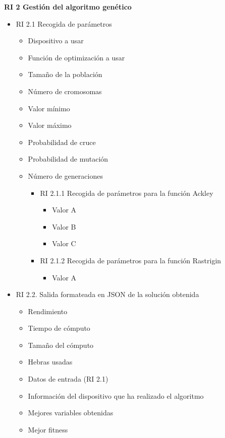 \textbf{RI 2 Gestión del algoritmo genético}

\begin{itemize}
	\item RI 2.1 Recogida de parámetros 
	
	\begin{itemize}
		\item Dispositivo a usar
		\item Función de optimización a usar
		\item Tamaño de la población
		\item Número de cromosomas
		\item Valor mínimo
		\item Valor máximo
		\item Probabilidad de cruce
		\item Probabilidad de mutación
		\item Número de generaciones
		\begin{itemize}
			\item RI 2.1.1 Recogida de parámetros para la función Ackley
			\begin{itemize}
				\item Valor A
				\item Valor B
				\item Valor C
			\end{itemize}
			
			\item RI 2.1.2 Recogida de parámetros para la función Rastrigin
			\begin{itemize}
				\item Valor A
			\end{itemize}
		\end{itemize}
	\end{itemize}
	
	
	\item RI 2.2. Salida formateada en JSON de la solución obtenida
	\begin{itemize}
		\item Rendimiento
		\item Tiempo de cómputo
		\item Tamaño del cómputo
		\item Hebras usadas
		\item Datos de entrada (RI 2.1)
		\item Información del dispositivo que ha realizado el algoritmo
		\item Mejores variables obtenidas
		\item Mejor fitness
	\end{itemize}
	
\end{itemize}



